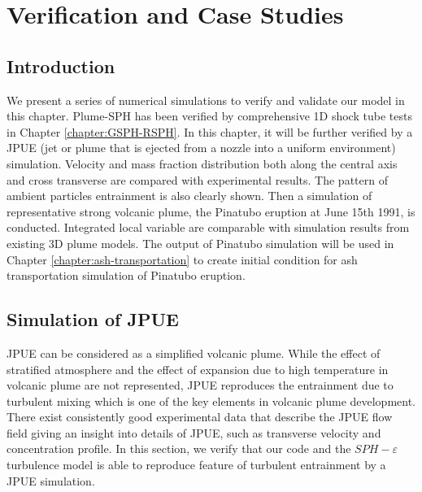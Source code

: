 \chapter{Verification and Case Studies} \label{chapter:case-studies}

\section{Introduction}
We present a series of numerical simulations to verify and validate our model in this chapter. Plume-SPH has been verified by comprehensive 1D shock tube tests in Chapter \ref{chapter:GSPH-RSPH}. In this chapter, it will be further verified by a JPUE (jet or plume that is ejected from a nozzle into a uniform environment) simulation. Velocity and mass fraction distribution both along the central axis and cross transverse are compared with experimental results. The pattern of ambient particles entrainment is also clearly shown. Then a simulation of representative strong volcanic plume, the Pinatubo eruption at June 15th 1991, is conducted. Integrated local variable are comparable with simulation results from existing 3D plume models.
The output of Pinatubo simulation will be used in Chapter \ref{chapter:ash-transportation} to create initial condition for ash transportation simulation of Pinatubo eruption.

\section{Simulation of JPUE}
JPUE can be considered as a simplified volcanic plume. While the effect of stratified atmosphere and the effect of expansion due to high temperature in volcanic plume are not represented, JPUE reproduces the entrainment due to turbulent mixing which is one of the key elements in volcanic plume development. There exist consistently good experimental data \citep { list1982turbulent,dimotakis1983structure, papanicolaou1988investigations, ezzamel2015dynamical} that describe the JPUE flow field giving an insight into details of JPUE, such as transverse velocity and concentration profile. In this section, we verify that our code and the $SPH-\varepsilon$ turbulence model is able to reproduce feature of turbulent entrainment by a JPUE simulation.

